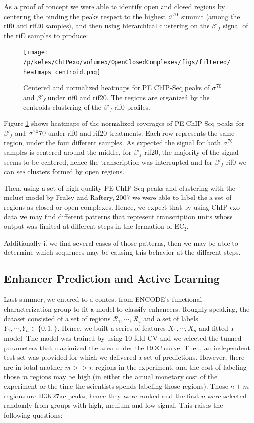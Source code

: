 \documentclass[11pt]{article}\usepackage[]{graphicx}\usepackage[]{color}
\begin{document}
As a proof of concept we were able to identify open and closed regions
by centering the binding the peaks respect to the highest $\sigma^{70}$
summit (among the rif0 and rif20 samples), and then using hierarchical
clustering on the $\beta'_f$ signal of the rif0 samples to produce:

\begin{figure}[H]
  \centering
 \texttt{[image: /p/keles/ChIPexo/volume5/OpenClosedComplexes/figs/filtered/heatmaps\_centroid.png]}
 \caption{Centered and normalized heatmaps for PE ChIP-Seq peaks of
   $\sigma^{70}$ and $\beta'_f$ under rif0 and rif20. The regions are
   organized by the centroids clustering of the $\beta'_f$-rif0
   profiles.}
  \label{fig:hm1}
\end{figure}

Figure \ref{fig:hm1} shows heatmaps of the normalized coverages of PE
ChIP-Seq peaks for $\beta'_f$ and $\sigma^{70}70$ under rif0 and rif20
treatments. Each row represents the same region, under the four
different samples. As expected the signal for both $\sigma^{70}$ samples is
centered around the middle, for $\beta'_f$-rif20, the majority of the
signal seems to be centered, hence the transcription was interrupted
and for $\beta'_f$-rif0 we can see clusters formed by open regions.

Then, using a set of high quality PE ChIP-Seq peaks and clustering
with the mclust model by Fraley and Raftery, 2007 \cite{mclust} we
were able to label the a set of regions as closed or open
complexes. Hence, we expect that by using ChIP-exo data we may find
different patterns that represent transcription units whose output was
limited at different steps in the formation of EC$_2$.

Additionally if we find several cases of those patterns, then we may
be able to determine which sequences may be causing this behavior at
the different steps.

\subsection{Enhancer Prediction and Active Learning}
\label{sec:enhancer}

Last summer, we entered to a contest from ENCODE's functional
characterization group to fit a model to classify enhancers. Roughly
speaking, the dataset consisted of a set of regions
$\mathcal{R}_1,\cdots,\mathcal{R}_n$ and a set of labels
$Y_1,\cdots,Y_n \in \{0,1,\}$. Hence, we built a series of features
$X_1,\cdots,X_p$ and fitted a model. The model was trained by using
10-fold CV and we selected the tunned parameters that maximized the
area under the ROC curve. Then, an independent test set was provided
for which we delivered a set of predictions. However, there are in
total another $m >> n$ regions in the experiment, and the cost of
labeling those $m$ regions may be high (in either the actual monetary
cost of the experiment or the time the scientists spends labeling
those regions). Those $n+m$ regions are H3K27ac peaks, hence they were
ranked and the first $n$ were selected randomly from groups with high,
medium and low signal. This raises the following questions:
\end{document}
